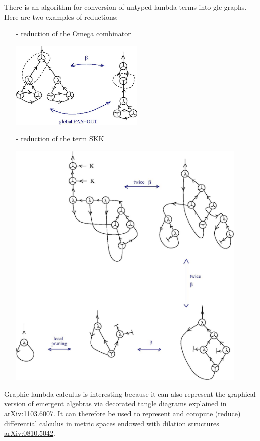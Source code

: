 \documentclass{article}
\begin{document}
There is an algorithm for conversion of untyped lambda terms into glc graphs. Here are two examples of reductions:
\begin{enumerate}
\item[-] reduction of the Omega combinator


\vspace{.5cm}
 
\centerline{\includegraphics[width=0.5\textwidth]{../img/glc/omega_manip.jpg}
}
\vspace{.5cm}
\item[-] reduction of the term SKK

\vspace{.5cm}
 
\centerline{\includegraphics[width=0.9\textwidth]{../img/glc/skk.jpg}
}
\end{enumerate}
\vspace{.5cm}
Graphic lambda calculus is interesting because it can also represent the graphical version of emergent algebras via decorated tangle diagrams explained in \href{https://arxiv.org/abs/1103.6007}{arXiv:1103.6007}. It can therefore be used to represent and compute (reduce) differential calculus in metric spaces endowed with dilation structures \href{https://arxiv.org/abs/0810.5042}{arXiv:0810.5042}.
\end{document}
